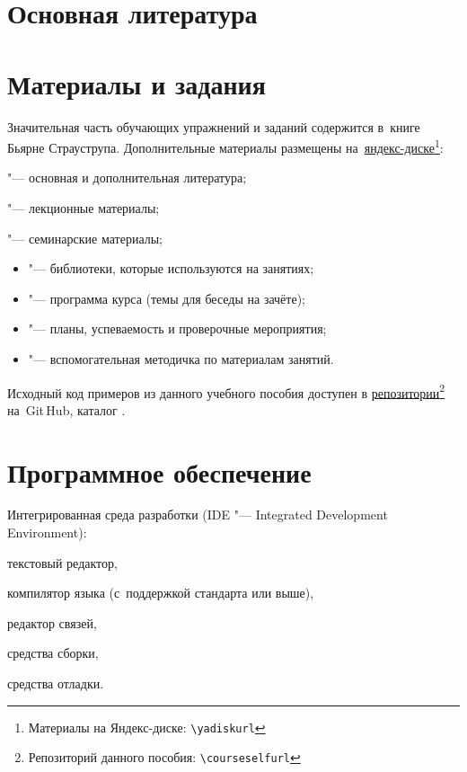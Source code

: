\section{Основная литература}
\cite{Stroustrup:2016:ru}

\nocite{Kernighan:2004:ru, Meyers:2006:ru, Meyers:2000:ru, Meyers:2002:ru, Meyers:2016:ru, Josuttis:2014:ru, Stroustrup:2006:ru, Stroustrup:2013:en}




\section{Материалы и задания}
Значительная часть обучающих упражнений и заданий содержится в~книге Бьярне Страуструпа. Дополнительные материалы размещены на~\href{\yadiskurl}{яндекс-диске\footnote{Материалы на Яндекс-диске: \nolinkurl{\yadiskurl}}}:
\begin{itemfeature}
  \item {} "--- основная и дополнительная литература;
  \item {} "--- лекционные материалы;
  \item {} "--- семинарские материалы;
  \begin{itemize}
  	\item {} "--- библиотеки, которые используются на занятиях;
  	\item {} "--- программа курса (темы для беседы на зачёте);
  	\item {} "--- планы, успеваемость и проверочные мероприятия;
  	\item {} "--- вспомогательная методичка по материалам занятий.
  \end{itemize}
\end{itemfeature}

Исходный код примеров из данного учебного пособия доступен в \href{\courseselfurl}{репозитории}\footnote{Репозиторий данного пособия: \nolinkurl{\courseselfurl}} на~Git\,Hub, каталог .



\section{Программное обеспечение}
Интегрированная среда разработки (IDE "--- \textenglish{Integrated Development Environment}):
\begin{itemfeature}
  \item текстовый редактор,
  \item компилятор языка  (с~поддержкой стандарта  или выше),
  \item редактор связей,
  \item средства сборки,
  \item средства отладки.
\end{itemfeature}



